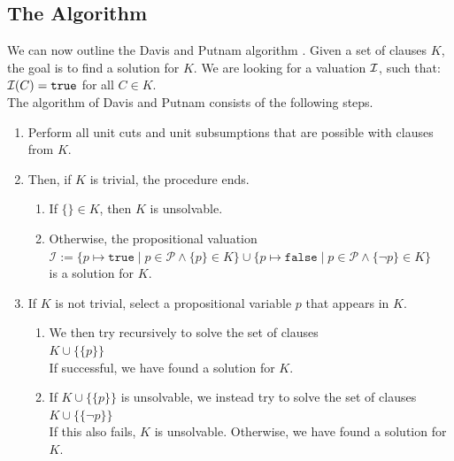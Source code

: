 \subsection{The Algorithm}
We can now outline the Davis and Putnam algorithm .
Given a set of clauses $K$, the goal is to find a solution for $K$. We
are looking for a valuation $\mathcal{I}$, such that: \\[0.2cm]
\hspace*{1.3cm} $\mathcal{I}(C) = \texttt{true}$ \quad for all $C \in K$.\\[0.2cm]
The algorithm of Davis and Putnam consists of the following steps.
\begin{enumerate}
\item Perform all unit cuts and unit subsumptions that are possible with clauses from $K$.
\item Then, if $K$ is trivial, the procedure ends.
     \begin{enumerate}
     \item If $\{\} \in K$, then $K$ is unsolvable.
     \item Otherwise, the propositional valuation
           \\[0.2cm]
           \hspace*{1.3cm}
           $\mathcal{I} := \bigl\{ p \mapsto \mathtt{true}  \mid p \in \mathcal{P} \wedge \{p\}\in K\bigr\} \cup
                           \bigl\{ p \mapsto \mathtt{false} \mid p \in \mathcal{P} \wedge \{\neg p\}\in K\bigr\}  $
           \\[0.2cm]
           is a solution for $K$.     
     \end{enumerate}
\item If $K$ is not trivial, select a propositional variable $p$ that appears in $K$.
      \begin{enumerate}
      \item We then try recursively to solve the set of clauses \\[0.2cm]
            \hspace*{1.3cm}  $K \cup \bigl\{\{p\}\bigr\}$ \\[0.2cm]
            If successful, we have found a solution for $K$.
      \item If $K \cup \bigl\{\{p\}\bigr\}$ is unsolvable, we instead try to solve the set of clauses
            \\[0.2cm] 
            \hspace*{1.3cm} $K \cup \bigl\{\{\neg p\}\bigr\}$
            \\[0.2cm]
            If this also fails, $K$ is unsolvable. Otherwise,
            we have found a solution for $K$.
      \end{enumerate}
\end{enumerate}
